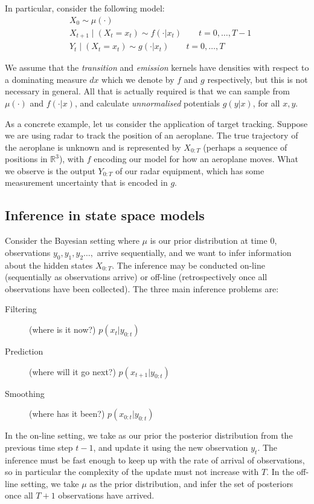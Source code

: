 \documentclass[fleqn]{article}
\theoremstyle{definition}
\begin{document}
In particular, consider the following model:
\begin{align*}
& X_0 \sim \mu(\cdot) \\
& X_{t+1} \mid (X_t = x_t) \sim f(\cdot | x_t)  \qquad t=0,\dots,T-1 \\
& Y_t \mid (X_t = x_t) \sim g(\cdot | x_t) \qquad t=0,\dots,T
\end{align*}

We assume that the \emph{transition} and \emph{emission} kernels have densities with respect to a dominating measure $dx$ which we denote by $f$ and $g$ respectively, but this is not necessary in general.
All that is actually required is that we can sample from $\mu(\cdot)$ and $f(\cdot | x)$, and calculate \emph{unnormalised} potentials $g(y|x)$, for all $x,y$.

As a concrete example, let us consider the application of target tracking. Suppose we 
are using radar to track the position of an aeroplane. The true trajectory of the aeroplane is unknown and is represented by $X_{0:T}$ (perhaps a sequence of positions in $\mathbb{R}^3$), with $f$ encoding our model for how an aeroplane moves. What we observe is the output $Y_{0:T}$ of our radar equipment, which has some measurement uncertainty that is encoded in $g$.

\subsection{Inference in state space models}
Consider the Bayesian setting where $\mu$ is our prior distribution at time 0, observations $y_0, y_1, y_2 \dots, $ arrive sequentially, and we want to infer information about the hidden states $X_{0:T}$. 
The inference may be conducted on-line (sequentially as observations arrive) or off-line (retrospectively once all observations have been collected).
The three main inference problems are:
\begin{description}
\item[Filtering] (where is it now?) $p(x_{t} | y_{0:t})$
\item[Prediction] (where will it go next?) $p(x_{t+1} | y_{0:t})$
\item[Smoothing] (where has it been?) $p(x_{0:t} | y_{0:t})$
\end{description}
In the on-line setting, we take as our prior the posterior distribution from the previous time step $t-1$, and update it using the new observation $y_t$. The inference must be fast enough to keep up with the rate of arrival of observations, so in particular the complexity of the update must not increase with $T$.
In the off-line setting, we take $\mu$ as the prior distribution, and infer the set of posteriors once all $T+1$ observations have arrived.
\end{document}
